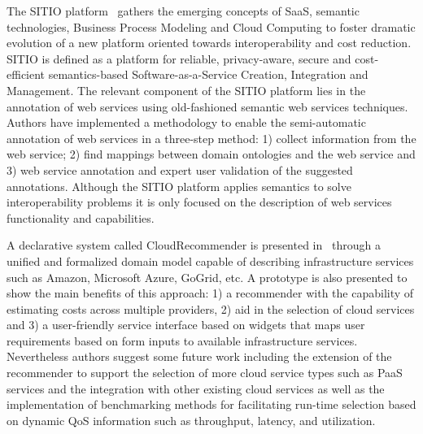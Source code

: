 The SITIO platform~\cite{Garcia-Sanchez:2010:ASS:1852403.1852409} gathers the emerging concepts of SaaS, semantic technologies, Business Process 
Modeling and Cloud Computing to foster dramatic evolution of a new platform oriented towards interoperability and cost reduction. SITIO is defined as a 
platform for reliable, privacy-aware, secure and cost-efficient semantics-based Software-as-a-Service Creation, Integration and Management. The relevant component 
of the SITIO platform lies in the annotation of web services using old-fashioned semantic web services techniques. Authors have implemented a methodology 
to enable the semi-automatic annotation of web services in a three-step method: 1) collect information from the web service; 2) find mappings between 
domain ontologies and the web service and 3) web service annotation and expert user validation of the suggested annotations. Although the SITIO platform applies 
semantics to solve interoperability problems it is only focused on the description of web services functionality and capabilities.

A declarative system called CloudRecommender is presented 
in~\cite{DBLP:conf/gecon/ZhangRNMH12} through a unified and formalized domain 
model capable of describing infrastructure services such as Amazon, Microsoft 
Azure, GoGrid, etc. A prototype is also presented to show the main benefits of 
this approach: 1) a recommender with the capability of estimating costs across 
multiple providers, 2) aid in the selection of cloud services and 3) a 
user-friendly service interface based on widgets that maps user requirements 
based on form inputs to available infrastructure services. Nevertheless authors 
suggest some future work including the extension of the recommender to support 
the selection of more cloud service types such as PaaS services and the 
integration with other existing cloud services as well as the implementation of 
benchmarking methods for facilitating run-time selection based on dynamic QoS 
information such as throughput, latency, and utilization.

